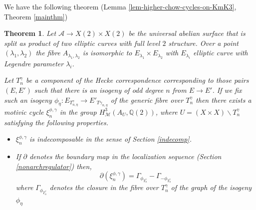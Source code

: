 \documentclass[11pt,a4paper]{article}
\newtheorem{thm}[defn]{Theorem}
\newcommand {\A}{{\mathcal A}}
\newcommand {\Q}{{\mathds Q}}
\newcommand {\M}{{\mathcal M}}
\newcommand {\lb}{{\lambda}}
\begin{document}
We have the following theorem (Lemma \ref{lem-higher-chow-cycles-on-KmK3}, Theorem \ref{mainthm})
\begin{thm} 
	
	Let $\A \to X(2) \times X(2)$ be the universal abelian surface that is split as product of two elliptic curves with full level $2$ structure. Over a point $(\lb_1,\lb_2)$ the fibre $A_{\lb_1,\lb_2}$ is isomorphic to $E_{\lb_1}\times E_{\lb_2}$ with $E_{\lambda_i}$ elliptic curve with Legendre parameter $\lambda_i$.
		
	 Let $T_n^{\gamma}$ be a component of the Hecke correspondence corresponding to those pairs $(E,E')$ such that there is an isogeny  of odd degree $n$ from $E \rightarrow E'$.  If we fix such an isogeny $\phi_{\eta}:E_{T^{\gamma}_{n,\eta}} \rightarrow E'_{T{\gamma}_{n,\eta}}$ of the generic fibre over $T^{\gamma}_n$ then there exists a motivic cycle $\xi_n^{\phi,\gamma}$  in the group $H^3_{\M}(A_U,\Q(2))$, where $U=(X \times X )\backslash T_n^{\gamma}$ satisfying the following properties.
	 
	 \begin{itemize}
	 	\item $\xi_n^{\phi,\gamma}$ is indecomposable in the sense of Section \ref{indecomp}.
	
	\item  If $\partial$ denotes the boundary map in the localization sequence (Section \ref{nonarchregulator}) then, 
	$$\partial(\xi_{n}^{\phi,\gamma})=\Gamma_{\phi_{T^{\gamma}_n}}-\Gamma_{-\phi_{T_n^{\gamma}}}$$
	where $\Gamma_{\phi_{T_n^{\gamma}}}$ denotes the closure in the fibre over $T_{n}^{\gamma}$ of the graph of the isogeny $\phi_{\eta}$
	
	\end{itemize}

	\end{thm} 
\end{document}
